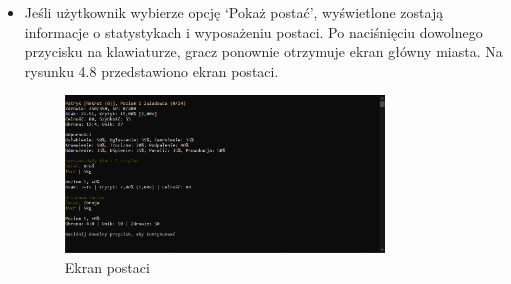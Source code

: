 \begin{itemize}
\begin{figure}[H]
                \label{fig:city_2}
            \end{figure}
        \item Jeśli użytkownik wybierze opcję `Pokaż postać', wyświetlone zostają informacje o statystykach i wyposażeniu postaci.
        Po naciśnięciu dowolnego przycisku na klawiaturze, gracz ponownie otrzymuje ekran główny miasta. Na rysunku 4.8 przedstawiono ekran postaci.
            \begin{figure}[H]
                \centering
                \includegraphics[width=0.8\textwidth]{figures/warstwa_uzytkowa/miasto_3.png}
                \caption{Ekran postaci}
                \label{fig:city_3}
            \end{figure}
\end{itemize}
